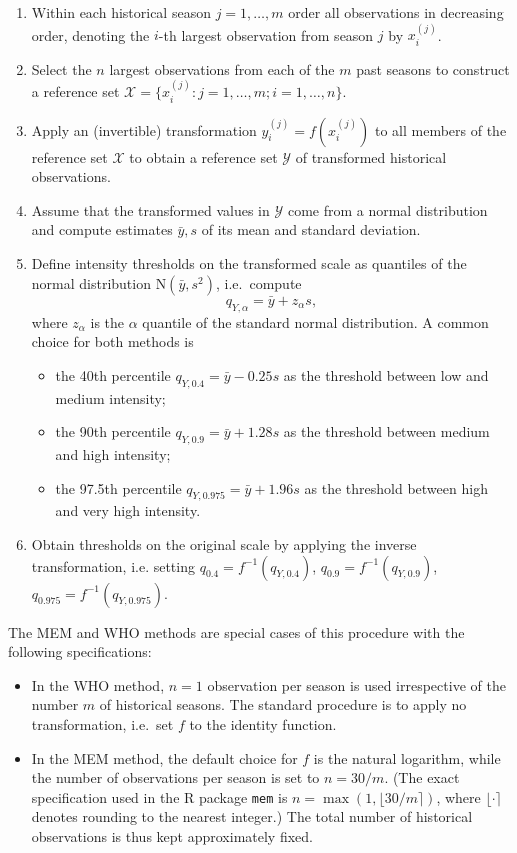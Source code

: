 \documentclass{article}
\newcommand{\sd}{s}
\begin{document}
\begin{enumerate}
\item Within each historical season $j = 1, \dots, m$ order all observations in decreasing order, denoting the $i$-th largest observation from season $j$ by $x^{(j)}_i$.
\item Select the $n$ largest observations from each of the $m$ past seasons to construct a reference set $\mathcal{X} = \{x_i^{(j)}: j = 1, \dots, m; i = 1, \dots, n\}$.
\item Apply an (invertible) transformation $y_i^{(j)} = f(x_i^{(j)})$ to all members of the reference set $\mathcal{X}$ to obtain a reference set $\mathcal{Y}$ of transformed historical observations.
\item Assume that the transformed values in $\mathcal{Y}$ come from a normal distribution and compute estimates $\bar{y}, \sd$ of its mean and standard deviation.
\item Define intensity thresholds on the transformed scale as quantiles of the normal distribution N$(\bar{y}, \sd^2)$, i.e.\ compute
\begin{equation}
q_{Y, \alpha} = \bar{y} + z_\alpha \sd, \label{eq:def_q}
\end{equation}
where $z_\alpha$ is the $\alpha$ quantile of the standard normal distribution. A common choice for both methods is
\begin{itemize}
\item the 40th percentile $q_{Y, 0.4} = \bar{y} - 0.25 \sd$ as the threshold between low and medium intensity;
\item the 90th percentile $q_{Y, 0.9} = \bar{y} + 1.28 \sd$ as the threshold between medium and high intensity;
\item the 97.5th percentile $q_{Y, 0.975} = \bar{y} + 1.96\sd$ as the threshold between high and very high intensity.
\end{itemize}
\item Obtain thresholds on the original scale by applying the inverse transformation, i.e. setting $q_{0.4} = f^{-1}(q_{Y, 0.4})$, $q_{0.9} = f^{-1}(q_{Y, 0.9})$, $q_{0.975} = f^{-1}(q_{Y, 0.975})$.
\end{enumerate}

\noindent The MEM and WHO methods are special cases of this procedure with the following specifications:
\begin{itemize}
\item In the WHO method, $n = 1$ observation per season is used irrespective of the number $m$ of historical seasons. The standard procedure is to apply no transformation, i.e.\ set $f$ to the identity function.
\item In the MEM method, the default choice for $f$ is the natural logarithm, while the number of observations per season is set to $n = 30/m$. (The exact specification used in the R package \texttt{mem} is $n = \max(1, \lfloor 30/m \rceil)$, where $\lfloor \cdot \rceil$ denotes rounding to the nearest integer.) The total number of historical observations is thus kept approximately fixed.
\end{itemize}
\end{document}
